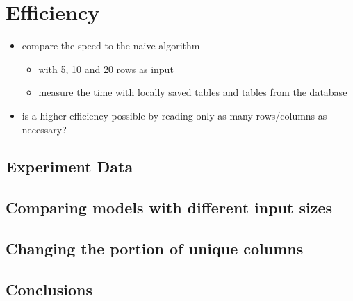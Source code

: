 \section{Efficiency}
\begin{itemize}
  \item compare the speed to the naive algorithm
        \begin{itemize}
          \item with 5, 10 and 20 rows as input
          \item measure the time with locally saved tables and tables from the database
        \end{itemize}
  \item is a higher efficiency possible by reading only as many rows/columns as necessary?
\end{itemize}

\subsection{Experiment Data}

\subsection{Comparing models with different input sizes}

\subsection{Changing the portion of unique columns}

\subsection{Conclusions}

